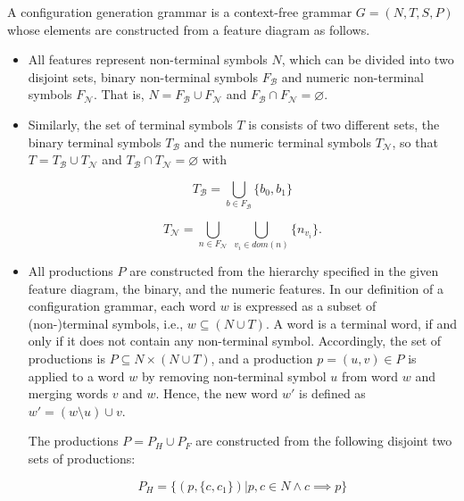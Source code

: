 \begin{definition}\label{def:cgg}
A configuration generation grammar is a context-free grammar $G = (N, T, S,
P)$ whose elements are constructed from a feature diagram as follows.

\begin{itemize}
  \item All features represent non-terminal symbols $N$, which can be divided
  into two disjoint sets, binary non-terminal symbols $F_\mathcal{B}$ and
  numeric non-terminal symbols $F_\mathcal{N}$. That is, $N = F_\mathcal{B}
  \cup F_\mathcal{N}$ and $F_\mathcal{B} \cap F_\mathcal{N} = \varnothing$.

  \item Similarly, the set of terminal symbols $T$ is consists of two different
  sets, the binary terminal symbols $T_\mathcal{B}$ and the numeric terminal
  symbols $T_\mathcal{N}$, so that $T = T_\mathcal{B} \cup T_\mathcal{N}$ and
  $T_\mathcal{B} \cap T_\mathcal{N} = \varnothing$ with
  
  \begin{equation}
  T_\mathcal{B} = \bigcup_{b\in F_\mathcal{B}} \lbrace b_0,  b_1\rbrace
  \end{equation}
  
  \begin{equation}
  T_\mathcal{N} = \bigcup_{n\in F_\mathcal{N}} ~ \bigcup_{v_i \in dom(n)}
  \lbrace n_{v_i}\rbrace.
  \end{equation}
  
  \item All productions $P$ are constructed from the hierarchy specified in the
  given feature diagram, the binary, and the numeric features. In our definition
  of a configuration grammar, each word $w$ is expressed as a subset of
  (non-)terminal symbols, i.e., $w \subseteq (N \cup T)$. A word is a terminal
  word, if and only if it does not contain any non-terminal symbol. Accordingly,
  the set of productions is $P \subseteq N \times (N \cup T)$, and a production
  $p = (u, v) \in P$ is applied to a word $w$ by removing non-terminal symbol
  $u$ from word $w$ and merging words $v$ and $w$. Hence, the new word $w'$ is
  defined as $w' = (w \setminus u) \cup v$.

  The productions $P = P_H \cup P_F$ are constructed from the following disjoint
  two sets of productions:
  
  \begin{equation}
  P_H = \lbrace (p, \lbrace c, c_1 \rbrace) | p, c \in N \land
  c \implies p\rbrace
  \end{equation}
  

\end{itemize}
\end{definition}

